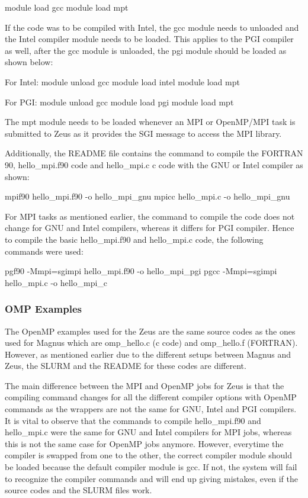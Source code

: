 \documentclass[journal]{IEEEtran}
\begin{document}
module load gcc
module load mpt

If the code was to be compiled with Intel, the gcc module needs to unloaded and the Intel compiler module needs to be loaded. This applies to the PGI
compiler as well, after the gcc module is unloaded, the pgi module should be loaded as shown below:

For Intel:
module unload gcc
module load intel
module load mpt

For PGI:
module unload gcc
module load pgi
module load mpt

The mpt module needs to be loaded whenever an MPI or OpenMP/MPI task is submitted to Zeus as it provides the SGI message to access the MPI library.

Additionally, the README file contains the command to compile the FORTRAN 90, hello_mpi.f90 code  and hello_mpi.c c code with the GNU or Intel compiler 
as shown:

mpif90 hello_mpi.f90 -o hello_mpi_gnu
mpicc hello_mpi.c -o hello_mpi_gnu

For MPI tasks as mentioned earlier, the command to compile the code does not change for GNU and Intel compilers, whereas it differs for PGI compiler.
Hence to compile the basic hello_mpi.f90 and hello_mpi.c code, the following commands were used:

pgf90 -Mmpi=sgimpi hello_mpi.f90 -o hello_mpi_pgi
pgcc -Mmpi=sgimpi hello_mpi.c -o hello_mpi_c 
  

\subsubsection{OMP Examples}

The OpenMP examples used for the Zeus are the same source codes as the ones used for Magnus which are omp_hello.c (c code) and omp_hello.f (FORTRAN).
However, as mentioned earlier due to the different setups between Magnus and Zeus, the SLURM and the README for these codes are different.

The main difference between the MPI and OpenMP jobs for Zeus is that the compiling command changes for all the different compiler options with OpenMP
commands as the wrappers are not the same for GNU, Intel and PGI compilers. It is vital to observe that the commands to compile hello_mpi.f90 and
hello_mpi.c were the same for GNU and Intel compilers for MPI jobs, whereas this is not the same case for OpenMP jobs anymore. However, everytime the
compiler is swapped from one to the other, the correct compiler module should be loaded because the default compiler module is gcc. If not, the system will fail to recognize the compiler commands
and will end up giving mistakes, even if the source codes and the SLURM files work.
\end{document}
